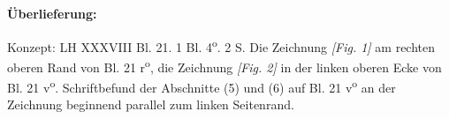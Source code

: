       
               
                \begin{ledgroupsized}[r]{120mm}
                \footnotesize 
                \pstart                
                \noindent\textbf{\"{U}berlieferung:}   
                \pend
                \end{ledgroupsized}
            
              
                            \begin{ledgroupsized}[r]{114mm}
                            \footnotesize 
                            \pstart \parindent -6mm
                            Konzept: LH XXXVIII Bl. 21. 1 Bl. 4\textsuperscript{o}. 2 S. Die Zeichnung \textit{[Fig. 1]} am rechten oberen Rand von Bl. 21 r\textsuperscript{o}, die Zeichnung \textit{[Fig. 2]} in der linken oberen Ecke von Bl. 21 v\textsuperscript{o}. Schriftbefund der Abschnitte (5) und (6) auf Bl. 21 v\textsuperscript{o} an der Zeichnung beginnend parallel zum linken Seitenrand. \pend
                            \end{ledgroupsized}
              

